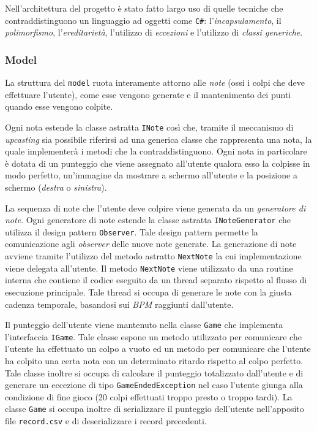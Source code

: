 \vspace{0.5cm}
Nell'architettura del progetto è stato fatto largo uso di quelle tecniche che contraddistinguono un linguaggio ad oggetti come \texttt{C\#}: l'\emph{incapsulamento}, il \emph{polimorfismo}, l'\emph{ereditarietà}, l'utilizzo di \emph{eccezioni} e l'utilizzo di \emph{classi generiche}.

\subsubsection{Model}
La struttura del \texttt{model} ruota interamente attorno alle \emph{note} (ossi i colpi che deve effettuare l'utente), come esse vengono generate e il mantenimento dei punti quando esse vengono colpite.

Ogni nota estende la classe astratta \texttt{INote} così che, tramite il meccanismo di \emph{upcasting} sia possibile riferirsi ad una generica classe che rappresenta una nota, la quale implementerà i metodi che la contraddistinguono.
Ogni nota in particolare è dotata di un punteggio che viene assegnato all'utente qualora esso la colpisse in modo perfetto, un'immagine da mostrare a schermo all'utente e la posizione a schermo (\emph{destra} o \emph{sinistra}).

La sequenza di note che l'utente deve colpire viene generata da un \emph{generatore di note}. Ogni generatore di note estende la classe astratta \texttt{INoteGenerator} che utilizza il design pattern \texttt{Observer}. Tale design pattern permette la comunicazione agli \emph{observer} delle nuove note generate.
La generazione di note avviene tramite l'utilizzo del metodo astratto \texttt{NextNote} la cui implementazione viene delegata all'utente.
Il metodo \texttt{NextNote} viene utilizzato da una routine interna che contiene il codice eseguito da un thread separato rispetto al flusso di esecuzione principale.
Tale thread si occupa di generare le note con la giusta cadenza temporale, basandosi sui \emph{BPM} raggiunti dall'utente.

Il punteggio dell'utente viene mantenuto nella classe \texttt{Game} che implementa l'interfaccia \texttt{IGame}. Tale classe espone un metodo utilizzato per comunicare che l'utente ha effettuato un colpo a vuoto ed un metodo per comunicare che l'utente ha colpito una certa nota con un determinato ritardo rispetto al colpo perfetto.
Tale classe inoltre si occupa di calcolare il punteggio totalizzato dall'utente e di generare un eccezione di tipo \texttt{GameEndedException} nel caso l'utente giunga alla condizione di fine gioco (20 colpi effettuati troppo presto o troppo tardi).
La classe \texttt{Game} si occupa inoltre di serializzare il punteggio dell'utente nell'apposito file \texttt{record.csv} e di deserializzare i record precedenti.

